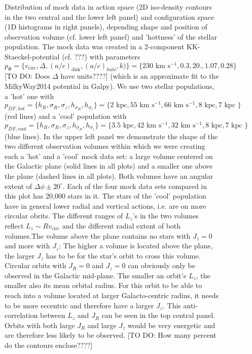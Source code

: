 \documentclass[12pt,preprint]{aastex}
\begin{document}


\begin{figure}[H]
\caption{Distribution of mock data in action space (2D iso-density contours in the two central and the lower left panel) and configuration space (1D histograms in right panels), depending shape and position of observation volume (cf. lower left panel) and 'hottness' of the stellar population. The mock data was created in a 2-component KK-Staeckel-potential (cf. ???) with parameters $p_\Phi = \{v_\text{circ}, \Delta, (a/c)_\text{disk},(a/c)_{halo},k)\} = \{230\text{ km s$^{-1}$},0.3,20.,1.07, 0.28\}$ [TO DO: Does $\Delta$ have units????] (which is an approximate fit to the MilkyWay2014 potential in Galpy). We use two stellar populations, a 'hot' one with $p_{DF,hot} = \{ h_R, \sigma_R, \sigma_z,h_{\sigma_R},h_{\sigma_z}\} =\{2 \text{ kpc}, 55 \text{ km s$^{-1}$}, 66 \text{ km s$^{-1}$}, 8 \text{ kpc}, 7 \text{ kpc }\} $ (red lines) and a 'cool' population with $p_{DF,cool} = \{ h_R, \sigma_R, \sigma_z,h_{\sigma_R},h_{\sigma_z}\} =\{3.5 \text{ kpc}, 42 \text{ km s$^{-1}$}, 32 \text{ km s$^{-1}$}, 8 \text{ kpc}, 7 \text{ kpc }\} $ (blue lines). In the upper left panel we demonstrate the shape of the two different observation volumes within which we were creating each a 'hot' and a 'cool' mock data set: a large volume centered on the Galactic plane (solid lines in all plots) and a smaller one above the plane (dashed lines in all plots). Both volumes have an angular extent of $\Delta\phi \pm 20^\circ$. Each of the four mock data sets compared in this plot has 20,000 stars in it. The stars of the 'cool' population have in general lower radial and vertical actions, i.e. are on more circular obrits. The different ranges of $L_z$'s in the two volumes reflect $L_z \sim R  v_\text{circ}$ and the different radial extent of both volumes.The volume above the plane contains no stars with $J_z = 0$ and more with $J_z$: The higher a volume is located above the plane, the larger $J_z$ has to be for the star's orbit to cross this volume. Circular orbits with $J_R = 0$ and $J_z = 0$ can obviously only be observed in the Galactic mid-plane. The smaller an orbit's $L_z$, the smaller also its mean orbital radius. For this orbit to be able to reach into a volume located at larger Galacto-centric radius, it needs to be more eccentric and therefore have a larger $J_z$. This anti-correlation between $L_z$ and $J_R$ can be seen in the top central panel. Orbits with both large $J_R$ and large $J_z$ would be very energetic and are therefore less likely to be observed. [TO DO: How many percent do the contours enclose????]} 
\label{fig:mockdatadistr}
\end{figure}
\end{document}
